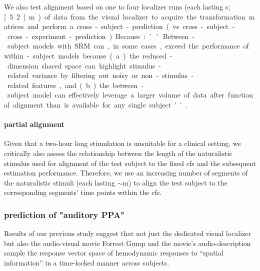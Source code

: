 
%
We also test alignment based on one to four localizer runs (each lasting
\unit[312]{s}; \unit[5.2]{m}) of data from the visual localizer to acquire the
transformation matrices and perform a cross-subject-prediction (vs.
cross-subject-cross-experiment-prediction).
%
Because: ``Between-subject models with SRM can, in some cases, exceed the
performance of within-subject models because (a) the reduced-dimension shared
space can highlight stimulus-related variance by filtering out noisy or
non-stimulus-related features, and (b) the between-subject model can effectively
leverage a larger volume of data after functional alignment than is available
for any single subject'' \citep{kumar2020brainiak}.


\paragraph{partial alignment}


Given that a two-hour long stimulation is unsuitable for a clinical setting, we
critically also assess the relationship between the length of the naturalistic
stimulus used for alignment of the test subject to the fixed \ac{cfs} and the
subsequent estimation performance.
%
Therefore, we use an increasing number of segments of the naturalistic stimuli
(each lasting $\sim$\unit[15]{m}) to align the test subject to the corresponding
segments' time points within the \ac{cfs}.


\subsubsection{prediction of "auditory PPA"}


%
Results of our previous study \citep{haeusler2022processing} suggest that not
just the dedicated visual localizer \citep{sengupta2016extension} but also the
audio-visual movie Forrest Gump \citep{hanke2016simultaneous} and the movie's
audio-description \citep{hanke2014audiomovie} sample the response vector space
of hemodynamic responses to ``spatial information'' in a time-locked manner
across subjects.



